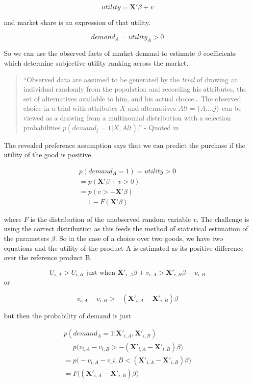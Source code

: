 \documentclass[]{tufte-book}
\theoremstyle{definition}
\theoremstyle{definition}
\theoremstyle{definition}
\theoremstyle{remark}
\begin{document}
\[ utility = \mathbf{X'}\beta + v\]

and market share is an expression of that utility.

\[ demand_A = utility_{A} > 0 \]

So we can use the observed facts of market demand to estimate \(\beta\) coefficients which determine subjective utility ranking across the market.

\begin{quote}
``Observed data are assumed to be generated by the \emph{trial} of drawing an individual randomly from the population and recording his attributes, the set of alternatives available to him, and his actual choice\ldots{} The observed choice in a trial with attributes \(X\) and alternatives \(Alt = \{A.... j \}\) can be viewed as a drawing from a multinomial distribution with a selection probabilities \(p(demand_{j} = 1| X, Alt)\).'' - Quoted in \citep{McFaddenCondLogit}
\end{quote}

The revealed preference assumption says that we can predict the purchase if the utility of the good is positive.

\begin{equation}
\begin{split}
  p(demand_A = 1) = utility > 0 
\\ = p(\mathbf{X'}\beta + v > 0) 
\\ = p(v > - \mathbf{X'}\beta ) 
\\ = 1 - F(\mathbf{X'}\beta ) 
\end{split}
\end{equation}

where \(F\) is the distribution of the unobserved random variable \(v\). The challenge is using the correct distribution as this feeds the method of statistical estimation of the parameters \(\beta\). So in the case of a choice over two goods, we have two equations and the utility of the product A is estimated as its positive difference over the reference product B.

\[U_{i,A} > U_{i, B} \text{ just when } \mathbf{X'}_{i, A}\beta + v_{i,A} > \mathbf{X'}_{i, B}\beta + v_{i,B}\]
or

\[  v_{i,A} -  v_{i,B} > - (\mathbf{X'}_{i, A}  - \mathbf{X'}_{i, B})\beta \]

but then the probability of demand is just

\begin{equation}
\begin{split}
p(demand_A = 1 | \mathbf{X'}_{i, A}, \mathbf{X'}_{i, B}) 
\\ = p\Bigg( v_{i,A} -  v_{i,B} > - (\mathbf{X'}_{i, A}  - \mathbf{X'}_{i, B})\beta \Bigg) 
\\ = p\Bigg( -v_{i,A} -  v\_{i,B} < (\mathbf{X'}_{i, A}  - \mathbf{X'}_{i, B})\beta \Bigg) 
\\ = F\Bigg( (\mathbf{X'}_{i, A}  - \mathbf{X'}_{i, B})\beta \Bigg) 
\end{split}
\end{equation}
\end{document}
